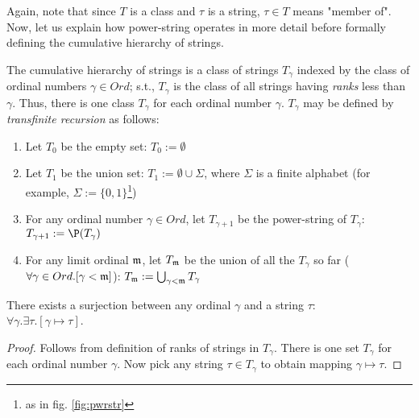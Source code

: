 Again, note that since $T$ is a class and $\tau$ is a string, $\tau \in T$ means "member of". Now, let us explain how power-string operates in more detail before formally defining the cumulative hierarchy of strings.

\begin{definition}\label{def_comThrch}
  The cumulative hierarchy of strings is a class of strings $T_\gamma$ indexed by the class of ordinal numbers $\gamma \in Ord$; s.t., $T_\gamma$ is the class of all strings having \textit{ranks} less than $\gamma$. Thus, there is one class $T_\gamma$ for each ordinal number $\gamma$. $T_\gamma$ may be defined by \textit{transfinite recursion} as follows:
  
  \begin{enumerate}
    \item Let $T_0$ be the empty set: $T_0 := \emptyset$ 
  
    \item Let $T_1$ be the union set: $T_1 := \emptyset \cup \Sigma$, where $\Sigma$ is a finite alphabet (for example, $\Sigma := \{0,1\}$\footnote{as in fig. \ref{fig:pwrstr}})    

    \item For any ordinal number $\gamma \in Ord$, let $T_{\gamma + 1}$ be the power-string of $T_{\gamma}$: $T_{\gamma + 1} := \P(T_{\gamma})$
    
    \item For any limit ordinal $\mathfrak{m}$, let $T_{\mathfrak{m}}$ be the union of all the $T_\gamma$ so far ($\forall \gamma \in Ord . [\gamma < \mathfrak{m}]$): $T_{\mathfrak{m}} := \bigcup_{\gamma < \mathfrak{m}} T_{\gamma}$
    
  \end{enumerate}
\end{definition}

\begin{lemma}
  There exists a surjection between any ordinal $\gamma$ and a string $\tau$: \\ $\forall \gamma.\exists \tau.[\gamma \mapsto \tau]$.
\end{lemma}
\begin{proof}
  Follows from definition of ranks of strings in $T_\gamma$. There is one set $T_\gamma$ for each ordinal number $\gamma$. Now pick any string $\tau \in T_\gamma$ to obtain mapping $\gamma \mapsto \tau$.
\end{proof}

